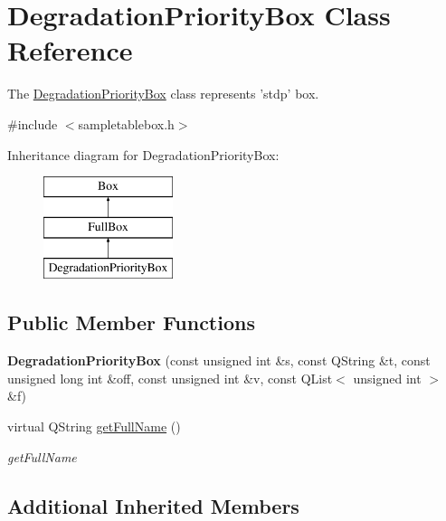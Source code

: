 \hypertarget{class_degradation_priority_box}{\section{Degradation\-Priority\-Box Class Reference}
\label{class_degradation_priority_box}
}


The \hyperlink{class_degradation_priority_box}{Degradation\-Priority\-Box} class represents 'stdp' box.  




{\ttfamily \#include $<$sampletablebox.\-h$>$}

Inheritance diagram for Degradation\-Priority\-Box\-:\begin{figure}[H]
\begin{center}
\leavevmode
\includegraphics[height=3.000000cm]{class_degradation_priority_box}
\end{center}
\end{figure}
\subsection*{Public Member Functions}
\begin{DoxyCompactItemize}
\item 
\hypertarget{class_degradation_priority_box_ae26db0b571456b1637c26f48dd8e38de}{{\bfseries Degradation\-Priority\-Box} (const unsigned int \&s, const Q\-String \&t, const unsigned long int \&off, const unsigned int \&v, const Q\-List$<$ unsigned int $>$ \&f)}\label{class_degradation_priority_box_ae26db0b571456b1637c26f48dd8e38de}

\item 
virtual Q\-String \hyperlink{class_degradation_priority_box_a97f91434e74e47bc9e10ff9a21dd3023}{get\-Full\-Name} ()
\begin{DoxyCompactList}\small\item\em get\-Full\-Name \end{DoxyCompactList}\end{DoxyCompactItemize}
\subsection*{Additional Inherited Members}


